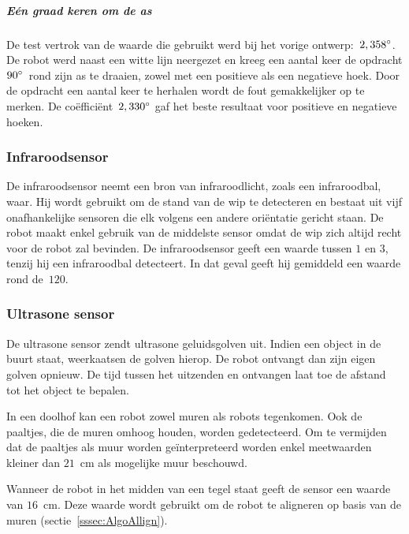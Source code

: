 \documentclass[eind]{penoverslag}
\begin{document}
\subparagraph{E\'en graad keren om de as}
De test vertrok van de waarde die gebruikt werd bij het vorige ontwerp:~$2,358\degree$. De robot werd naast een witte lijn neergezet en kreeg een aantal keer de opdracht $90\degree$~rond zijn as te draaien, zowel met een positieve als een negatieve hoek. Door de opdracht een aantal keer te herhalen wordt de fout gemakkelijker op te merken.
De co\"effici\"ent~$2,330\degree$ gaf het beste resultaat voor positieve en negatieve hoeken.



\subsubsection{Infraroodsensor}
De infraroodsensor neemt een bron van infraroodlicht, zoals een infraroodbal, waar. Hij wordt gebruikt om de stand van de wip te detecteren en bestaat uit vijf onafhankelijke sensoren die elk volgens een andere ori\"entatie gericht staan. De robot maakt enkel gebruik van de middelste sensor omdat de wip zich altijd recht voor de robot zal bevinden. De infraroodsensor geeft een waarde tussen $1$ en $3$, tenzij hij een infraroodbal detecteert. In dat geval geeft hij gemiddeld een waarde rond de~$120$.

\subsubsection{Ultrasone sensor}
De ultrasone sensor zendt ultrasone geluidsgolven uit. Indien een object in de buurt staat, weerkaatsen de golven hierop. De robot ontvangt dan zijn eigen golven opnieuw. De tijd tussen het uitzenden en ontvangen laat toe de afstand tot het object te bepalen.

In een doolhof kan een robot zowel muren als robots tegenkomen. Ook de paaltjes, die de muren omhoog houden, worden gedetecteerd. Om te vermijden dat de paaltjes als muur worden ge\"interpreteerd worden enkel meetwaarden kleiner dan $21$~cm als mogelijke muur beschouwd.

Wanneer de robot in het midden van een tegel staat geeft de sensor een waarde van $16$~cm. Deze waarde wordt gebruikt om de robot te aligneren op basis van de muren (sectie~\ref{sssec:AlgoAllign}).

\end{document}
